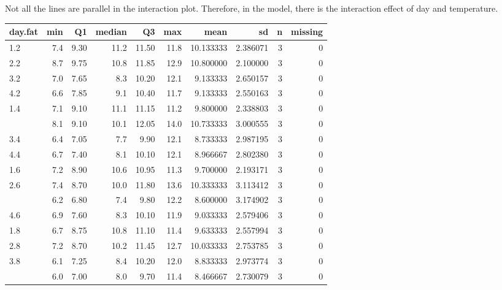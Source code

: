 \documentclass[12pt,]{article}
\begin{document}
Not all the lines are parallel in the interaction plot. Therefore, in
the model, there is the interaction effect of day and temperature.

\begin{table}[H]
\centering\begingroup\fontsize{8}{10}\selectfont

\begin{tabular}{lrrrrr>{\columncolor[HTML]{EAFAF1}}rrrr}
\toprule
day.fat & min & Q1 & median & Q3 & max & mean & sd & n & missing\\
\midrule
1.2 & 7.4 & 9.30 & 11.2 & 11.50 & 11.8 & 10.133333 & 2.386071 & 3 & 0\\
2.2 & 8.7 & 9.75 & 10.8 & 11.85 & 12.9 & 10.800000 & 2.100000 & 3 & 0\\
3.2 & 7.0 & 7.65 & 8.3 & 10.20 & 12.1 & 9.133333 & 2.650157 & 3 & 0\\
4.2 & 6.6 & 7.85 & 9.1 & 10.40 & 11.7 & 9.133333 & 2.550163 & 3 & 0\\
1.4 & 7.1 & 9.10 & 11.1 & 11.15 & 11.2 & 9.800000 & 2.338803 & 3 & 0\\
\addlinespace
2.4 & 8.1 & 9.10 & 10.1 & 12.05 & 14.0 & 10.733333 & 3.000555 & 3 & 0\\
3.4 & 6.4 & 7.05 & 7.7 & 9.90 & 12.1 & 8.733333 & 2.987195 & 3 & 0\\
4.4 & 6.7 & 7.40 & 8.1 & 10.10 & 12.1 & 8.966667 & 2.802380 & 3 & 0\\
1.6 & 7.2 & 8.90 & 10.6 & 10.95 & 11.3 & 9.700000 & 2.193171 & 3 & 0\\
2.6 & 7.4 & 8.70 & 10.0 & 11.80 & 13.6 & 10.333333 & 3.113412 & 3 & 0\\
\addlinespace
3.6 & 6.2 & 6.80 & 7.4 & 9.80 & 12.2 & 8.600000 & 3.174902 & 3 & 0\\
4.6 & 6.9 & 7.60 & 8.3 & 10.10 & 11.9 & 9.033333 & 2.579406 & 3 & 0\\
1.8 & 6.7 & 8.75 & 10.8 & 11.10 & 11.4 & 9.633333 & 2.557994 & 3 & 0\\
2.8 & 7.2 & 8.70 & 10.2 & 11.45 & 12.7 & 10.033333 & 2.753785 & 3 & 0\\
3.8 & 6.1 & 7.25 & 8.4 & 10.20 & 12.0 & 8.833333 & 2.973774 & 3 & 0\\
\addlinespace
4.8 & 6.0 & 7.00 & 8.0 & 9.70 & 11.4 & 8.466667 & 2.730079 & 3 & 0\\
\bottomrule
\end{tabular}
\endgroup{}
\end{table}
\end{document}
